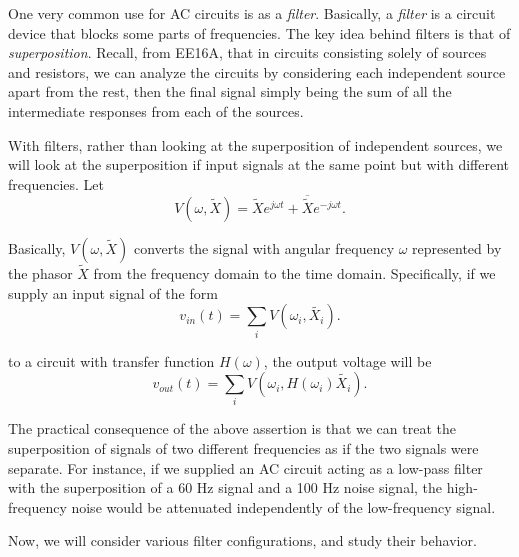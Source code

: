 
One very common use for AC circuits is as a \emph{filter}.
Basically, a \emph{filter} is a circuit device that blocks some parts of frequencies.
The key idea behind filters is that of \emph{superposition}.
Recall, from EE16A, that in circuits consisting solely of sources and resistors, we can analyze the circuits by considering each independent source apart from the rest, then the final signal simply being the sum of all the intermediate responses from each of the sources.

\vspace{0.2 cm} 

With filters, rather than looking at the superposition of independent sources, we will look at the superposition if input signals at the same point but with different frequencies.
Let
\[
  V(\omega, \widetilde{X}) = \widetilde{X}e^{j \omega t} + \overline{\widetilde{X}}e^{-j \omega t}
.\]

Basically, $V(\omega, \widetilde{X})$ converts the signal with angular frequency $\omega$ represented by the phasor $\widetilde{X}$ from the frequency domain to the time domain.
Specifically, if we supply an input signal of the form
\[
  v_{in}(t) = \sum_i V(\omega_i, \widetilde{X_i})
.\]

to a circuit with transfer function $H(\omega)$, the output voltage will be
\[
  v_{out}(t) = \sum_i V(\omega_i, H(\omega_i)\widetilde{X_i})
.\]

The practical consequence of the above assertion is that we can treat the superposition of signals of two different frequencies as if the two signals were separate.
For instance, if we supplied an AC circuit acting as a low-pass filter with the superposition of a 60 Hz signal and a 100 Hz noise signal, the high-frequency noise would be attenuated independently of the low-frequency signal. 

\vspace{0.2 cm}
Now, we will consider various filter configurations, and study their behavior.

